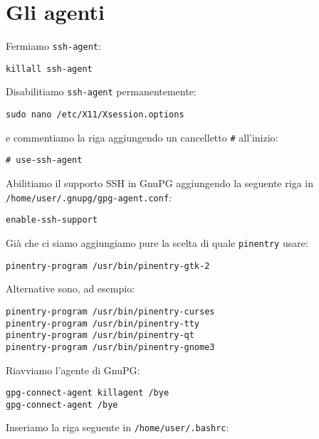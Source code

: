 \section{Gli agenti}

Fermiamo \texttt{ssh-agent}:

\begin{lstlisting}
killall ssh-agent
\end{lstlisting}

Disabilitiamo \texttt{ssh-agent} permanentemente:

\begin{lstlisting}
sudo nano /etc/X11/Xsession.options
\end{lstlisting}

e commentiamo la riga aggiungendo un cancelletto \texttt{\#} all'inizio:

\begin{lstlisting}
# use-ssh-agent
\end{lstlisting}

Abilitiamo il supporto SSH in GnuPG aggiungendo la seguente riga in
\texttt{/home/user/.gnupg/gpg-agent.conf}:

\begin{lstlisting}
enable-ssh-support
\end{lstlisting}

Già che ci siamo aggiungiamo pure la scelta di quale \texttt{pinentry} usare:

\begin{lstlisting}
pinentry-program /usr/bin/pinentry-gtk-2
\end{lstlisting}

Alternative sono, ad esempio:

\begin{lstlisting}
pinentry-program /usr/bin/pinentry-curses
pinentry-program /usr/bin/pinentry-tty
pinentry-program /usr/bin/pinentry-qt
pinentry-program /usr/bin/pinentry-gnome3
\end{lstlisting}

Riavviamo l'agente di GnuPG:

\begin{lstlisting}
gpg-connect-agent killagent /bye
gpg-connect-agent /bye
\end{lstlisting}

Inseriamo la riga seguente in \texttt{/home/user/.bashrc}:

